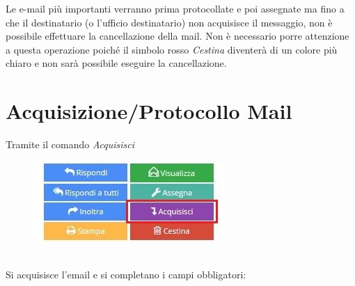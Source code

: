 \documentclass[a4paper,italian,12pt]{book}
\begin{document}
Le e-mail più importanti verranno prima protocollate e poi assegnate ma fino a che il destinatario (o l'ufficio destinatario) non acquisisce il messaggio, non è possibile effettuare la cancellazione della mail. Non è necessario porre attenzione a questa operazione poiché il simbolo rosso \textit{Cestina} diventerà di un colore più chiaro e non sarà possibile eseguire la cancellazione.

\section{Acquisizione/Protocollo Mail}
Tramite il comando \textit{Acquisisci}
\begin{figure}[ht]
\centering
\includegraphics[scale=1]{Figure/prot_mail.jpg} 
\end{figure} \\
Si acquisisce l'email e si completano i campi obbligatori:
\\
\\
\\
\\
\end{document}
